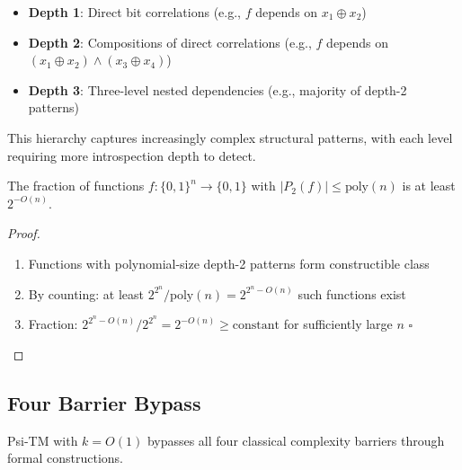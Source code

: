 \documentclass[11pt]{article}
\newcommand{\qed}{\hfill$\square$}
\begin{document}
\begin{example}
\begin{itemize}
\item \textbf{Depth 1}: Direct bit correlations (e.g., $f$ depends on $x_1 \oplus x_2$)
\item \textbf{Depth 2}: Compositions of direct correlations (e.g., $f$ depends on $(x_1 \oplus x_2) \wedge (x_3 \oplus x_4)$)
\item \textbf{Depth 3}: Three-level nested dependencies (e.g., majority of depth-2 patterns)
\end{itemize}
This hierarchy captures increasingly complex structural patterns, with each level requiring more introspection depth to detect.
\end{example}

\begin{theorem}
The fraction of functions $f: \{0,1\}^n \to \{0,1\}$ with $|P_2(f)| \leq \text{poly}(n)$ is at least $2^{-O(n)}$.
\end{theorem}
\begin{proof}
\begin{enumerate}
\item Functions with polynomial-size depth-2 patterns form constructible class
\item By counting: at least $2^{2^n}/\text{poly}(n) = 2^{2^n - O(n)}$ such functions exist
\item Fraction: $2^{2^n - O(n)}/2^{2^n} = 2^{-O(n)} \geq \text{constant}$ for sufficiently large $n$ \qed
\end{enumerate}
\end{proof}

\subsection{Four Barrier Bypass}

\begin{theorem}
Psi-TM with $k = O(1)$ bypasses all four classical complexity barriers through formal constructions.
\end{theorem}
\end{document}
